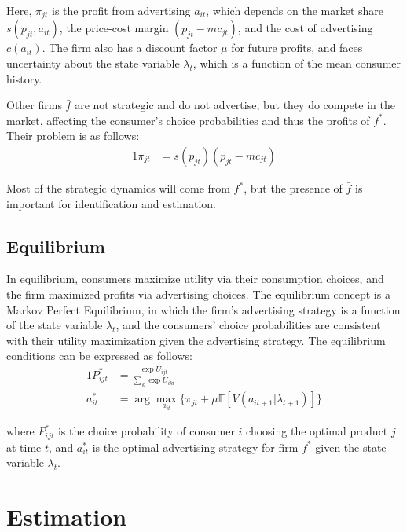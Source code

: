\documentclass[12pt]{article}
\begin{document}
    Here, $\pi_{jt}$ is the profit from advertising $a_{it}$, which depends on the market share $s(p_{jt}, a_{it})$, the price-cost margin $(p_{jt} - mc_{jt})$, and the cost of advertising $c(a_{it})$. The firm also has a discount factor $\mu$ for future profits, and faces uncertainty about the state variable $\lambda_t$, which is a function of the mean consumer history.

    Other firms $\bar{f}$ are not strategic and do not advertise, but they do compete in the market, affecting the consumer's choice probabilities and thus the profits of $f^*$. Their problem is as follows:
    \begin{alignat*}{1}
      \pi_{jt} &= s(p_{jt})(p_{jt} - mc_{jt})
    \end{alignat*}

    Most of the strategic dynamics will come from $f^*$, but the presence of $\bar{f}$ is important for identification and estimation.

    \subsection{Equilibrium}
    In equilibrium, consumers maximize utility via their consumption choices, and the firm maximized profits via advertising choices. The equilibrium concept is a Markov Perfect Equilibrium, in which the firm's advertising strategy is a function of the state variable $\lambda_t$, and the consumers' choice probabilities are consistent with their utility maximization given the advertising strategy. The equilibrium conditions can be expressed as follows:
    \begin{alignat*}{1}
      P_{ijt}^* &= \frac{\exp{U_{ijt}}}{\sum_k\exp{U_{ikt}}} \\
      a_{it}^* &= \arg\max_{a_{it}} \{\pi_{jt} + \mu \mathbb{E}[V(a_{it+1} | \lambda_{t+1})]\}
    \end{alignat*}

    where $P_{ijt}^*$ is the choice probability of consumer $i$ choosing the optimal product $j$ at time $t$, and $a_{it}^*$ is the optimal advertising strategy for firm $f^*$ given the state variable $\lambda_t$.

\section{Estimation}
\end{document}
